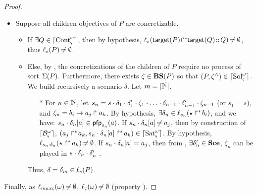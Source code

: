 \begin{proof}
\begin{itemize}
  \item Suppose all children objectives of $P$ are concretizable.
  \begin{itemize}
    \item If $\exists Q \in \lceil \mathrm{Cont}^\omega_\varsigma\rceil$, then by hypothesis,
      $\ell_{s}({\mathsf{target}(P)\!\Rsh^*\!\!\mathsf{target}(Q)} \!::\! Q) \not\nobreak\mkern -2mu = \emptyset$, thus
      $\ell_{s}(P) \not\nobreak\mkern -2mu = \emptyset$.
    \item Else, by , the concretizations of the children of $P$ require no process of sort $\Sigma(P)$.
      Furthermore, there exists $\zeta \in \mathbf{BS}(P)$ so that $(P, \zeta^\wedge) \in \lceil \mathrm{Sol}^\omega_\varsigma\rceil$.
      We build recursively a scenario $\delta$. Let $m = |\mathbb{I}^{\zeta}|$.
      \begin{itemize}
        \item[*] For $n \in \mathbb{I}^{\zeta}$, let $s_n = s \PHplay \delta_1 \PHplay \delta'_1 \PHplay \zeta_1 \PHplay \dots \PHplay \delta_{n-1} \PHplay \delta'_{n-1} \PHplay \zeta_{n-1}$ (or $s_1 = s$),
          and $\zeta_n = b_i\rightarrow a_j\Rsh a_k$. By hypothesis, $\exists \delta_n \in \ell_{s_n}(\mbox{$\star\Rsh^*\!b_i$})$, and we have: ${s_n \cdot \delta_n[a]} \in \mathsf{pfp}_{s_n}(a)$.
          If ${s_n \cdot \delta_n[a]} \not\nobreak\mkern -2mu = a_j$, then by construction of $\lceil \mathcal{B}_\varsigma^\omega\rceil$, $(\mbox{$a_j\Rsh^*\!a_k$}, \mbox{${s_n \cdot \delta_n[a]}\Rsh^*\!a_k$}) \in \lceil \mathrm{Sat}^\omega_\varsigma\rceil$.
          By hypothesis, $\ell_{s_n \cdot \delta_n}(\mbox{$\star\Rsh^*\!a_k$}) \not\nobreak\mkern -2mu = \emptyset$.
          If ${s_n \cdot \delta_n[a]} = a_j$, then from , $\exists \delta'_n \in \mathbf{Sce}$, $\zeta_n$ can be played in $s \cdot \delta_n \cdot \delta'_n$
          .
      \end{itemize}
      Thus, $\delta = \delta_m \in \ell_s(P)$. %
  \end{itemize}
\end{itemize}

Finally, as $\ell_{max\varsigma}(\omega) \not\nobreak\mkern -2mu = \emptyset$, $\ell_\varsigma(\omega) \not\nobreak\mkern -2mu = \emptyset$ (property ).
\end{proof}
